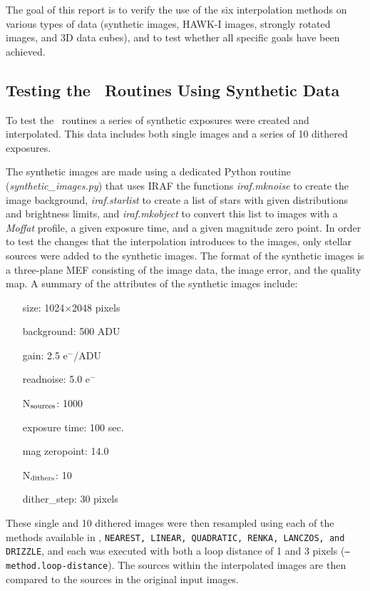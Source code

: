 The goal of this report is to verify the use of the six interpolation methods on various types of data (synthetic images, HAWK-I images, strongly rotated images, 
and 3D data cubes), and to test whether all specific goals have been achieved.



\subsection{Testing the \hdrlresample\ Routines Using Synthetic Data}


To test the \hdrlresample\ routines a series of synthetic exposures were created and interpolated.
This data includes both single images and a series of 10 dithered exposures.  

The synthetic images are made using a dedicated Python routine ({\it synthetic\_images.py}) that uses IRAF
the functions {\it iraf.mknoise} to create the image background, {\it iraf.starlist} to create a list of stars with given distributions
and brightness limits,  and {\it iraf.mkobject} to convert this list to images with a {\it Moffat} profile, a given exposure time,
and a given magnitude zero point.  In order to test the changes
that the interpolation introduces to the images, only stellar sources were added to the synthetic images.  The format of the
synthetic images is a three-plane MEF consisting of the image data, the image error, and the quality map.
A summary of the attributes of the synthetic images include:
\begin{itemize}[leftmargin=3cm]
\itemsep0em
\item[size:] 1024$\times$2048 pixels
\item[background:] 500 ADU
\item[gain:] 2.5 e$^{-}$/ADU
\item[readnoise:] 5.0 e$^{-}$
\item[N$_{\rm sources}$:] 1000
\item[exposure time:] 100 sec.
\item[mag zeropoint:] 14.0
\item[N$_{\rm dithers}$:] 10
\item[dither\_step:] 30 pixels
\end{itemize}

These single and 10 dithered images were then resampled using each of the methods available in \hdrlresample, 
{\tt NEAREST, LINEAR, QUADRATIC, RENKA, LANCZOS, and DRIZZLE}, and each was executed with both a 
loop distance of 1 and 3 pixels ({\tt --method.loop-distance}).
The sources within the interpolated images are then compared to the sources in the original input images.

